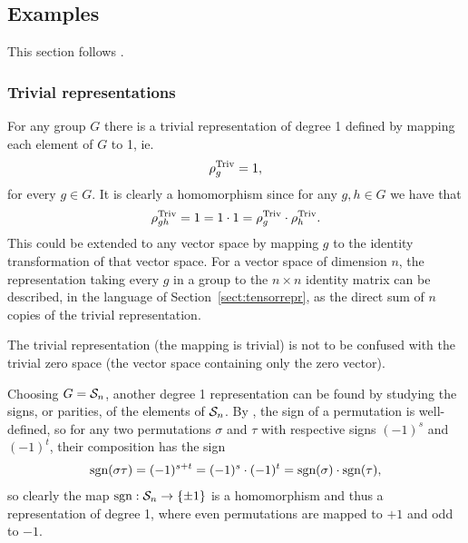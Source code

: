 \subsection{Examples}\label{sect:basicreprs}

This section follows \cite[1.2]{Serre}.

\subsubsection{Trivial representations}


\begin{example}\label{example:trivrepr}
	For any group $G$ there is a trivial representation of degree 1 defined by mapping each element of $G$ to 1, ie.
	\begin{align*}
		\rho_g^{\text{Triv}} = 1,
	\end{align*}
	for every $g \in G$. It is clearly a homomorphism since for any $g,h \in G$ we have that
	\begin{align*}
		\rho_{gh}^{\text{Triv}} = 1 = 1 \cdot 1 = \rho_g^{\text{Triv}} \cdot \rho_h^{\text{Triv}}.
	\end{align*}
	This could be extended to any vector space by mapping $g$ to the identity transformation of that vector space. For a vector space of dimension $n$, the representation taking every $g$ in a group to the $n \times n$ identity matrix can be described, in the language of Section~\ref{sect:tensorrepr}, as the direct sum of $n$ copies of the trivial representation.
\end{example}

\begin{note}
	The trivial representation (the mapping is trivial) is not to be confused with the trivial zero space (the vector space containing only the zero vector).
\end{note}

\begin{example}\label{example:altrepr}
	Choosing $G = \mathcal{S}_n$, another degree 1 representation can be found by studying the signs, or parities, of the elements of $\mathcal{S}_n$. By \cite[Thm.12.6.1.]{Biggs}, the sign of a permutation is well-defined, so for any two permutations $\sigma$ and $\tau$ with respective signs $(-1)^s$ and $(-1)^t$, their composition has the sign
	\begin{align*}
		\text{sgn}(\sigma\tau) = (-1)^{s+t} = (-1)^s \cdot (-1)^t = \text{sgn} (\sigma) \cdot \text{sgn} (\tau),
	\end{align*}
	so clearly the map $\text{sgn}: \mathcal{S}_n \rightarrow \{\pm 1\}$ is a homomorphism and thus a representation of degree 1, where even permutations are mapped to $+1$ and odd to $-1$.
\end{example}

